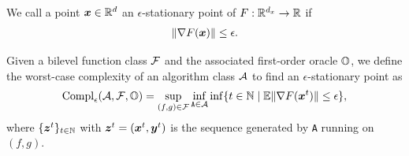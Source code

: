 \documentclass{article}
\begin{document}
\begin{dfn} \label{dfn:fo-sta}
We call 
a point ${\bm{x}} \in {\mathbb{R}}^d$ an $\epsilon$-stationary point of $F: {\mathbb{R}}^{d_x} \rightarrow {\mathbb{R}}$ if 
\begin{align*}
    \Vert \nabla F({\bm{x}}) \Vert \le \epsilon.
\end{align*}
\end{dfn}

\begin{dfn}
Given a bilevel function class ${\mathcal{F}}$  and the associated first-order oracle ${\mathbb{O}}$, we define the worst-case complexity of an algorithm class ${\mathcal{A}}$ to find an $\epsilon$-stationary point as
\begin{align*}
    {\rm Compl}_{\epsilon}({\mathcal{A}}, {\mathcal{F}}, {\mathbb{O}}) = \sup_{(f,g) \in {\mathcal{F}}} \inf_{\texttt{A} \in {\mathcal{A}}} \inf \{t \in {\mathbb{N}} \mid \mathbb{E} \Vert \nabla F({\bm{x}}^t) \Vert \le \epsilon \},
\end{align*}
where $\{{\bm{z}}^t\}_{t \in {\mathbb{N}}}$ with ${\bm{z}}^t = ({\bm{x}}^t,{\bm{y}}^t)$ is the sequence generated by \texttt{A} running on $(f,g)$.
\end{dfn}







\end{document}
